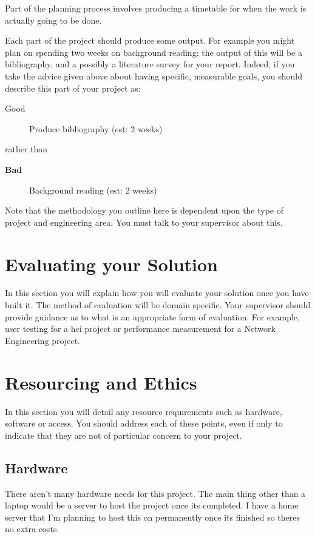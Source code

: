 \documentclass[11pt, a4paper, twoside, openright]{article}
\begin{document}
	Part of the planning process involves producing a timetable for when
	the work is actually going to be done.
	
	Each part of the project should produce some output. For example you
	might plan on spending two weeks on background reading: the output of
	this will be a bibliography, and a possibly a literature survey for
	your report. Indeed, if you take the advice given above about having
	specific, measurable goals, you should describe this part of your
	project as:
	
	\begin{description}
		\item[Good] Produce bibliography (est: 2 weeks)
	\end{description}
	rather than
	\begin{description}
		\item[\bf Bad] Background reading (est: 2 weeks)
	\end{description}
	
	Note that the methodology you outline here is dependent upon the type
	of project and engineering area. You must talk to your supervisor
	about this.
	
	\section{Evaluating your Solution}
	
	In this section you will explain how you will evaluate your solution
	once you have built it. The method of evaluation will be domain
	specific. Your supervisor should provide guidance as to what is an
	appropriate form of evaluation. For example, user testing for a \gls{hci} project or performance measurement for a Network Engineering project.
	
	\section{Resourcing and Ethics}
	
	In this section you will detail any resource requirements such as hardware, software or access. You should address each of these points, even if only to indicate that they are not of particular concern to your project.
	
	
	\subsection{Hardware}
	
	There aren't many hardware needs for this project. The main thing other than a laptop would be a server to host the project once its completed. I have a home server that I'm planning to host this on permanently once its finished so theres no extra costs.
	
\end{document}
